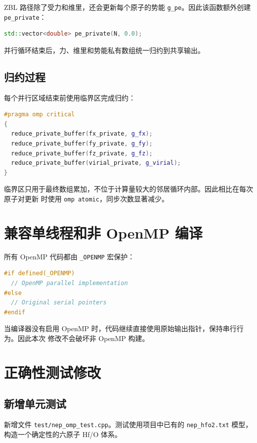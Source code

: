 \documentclass[11pt,a4paper,fontset=fandol]{ctexart}
\begin{document}
ZBL 路径除了受力和维里，还会更新每个原子的势能 \texttt{g\_pe}。因此该函数额外创建
\texttt{pe\_private}：

\begin{lstlisting}[language=C++]
std::vector<double> pe_private(N, 0.0);
\end{lstlisting}

并行循环结束后，力、维里和势能私有数组统一归约到共享输出。

\subsection{归约过程}

每个并行区域结束前使用临界区完成归约：

\begin{lstlisting}[language=C++]
#pragma omp critical
{
  reduce_private_buffer(fx_private, g_fx);
  reduce_private_buffer(fy_private, g_fy);
  reduce_private_buffer(fz_private, g_fz);
  reduce_private_buffer(virial_private, g_virial);
}
\end{lstlisting}

临界区只用于最终数组累加，不位于计算量较大的邻居循环内部。因此相比在每次原子对更新
时使用 \texttt{omp atomic}，同步次数显著减少。

\section{兼容单线程和非 OpenMP 编译}

所有 OpenMP 代码都由 \texttt{\_OPENMP} 宏保护：

\begin{lstlisting}[language=C++]
#if defined(_OPENMP)
  // OpenMP parallel implementation
#else
  // Original serial pointers
#endif
\end{lstlisting}

当编译器没有启用 OpenMP 时，代码继续直接使用原始输出指针，保持串行行为。因此本次
修改不会破坏非 OpenMP 构建。

\section{正确性测试修改}

\subsection{新增单元测试}

新增文件 \texttt{test/nep\_omp\_test.cpp}。测试使用项目中已有的
\texttt{nep\_hfo2.txt} 模型，构造一个确定性的六原子 Hf/O 体系。
\end{document}
